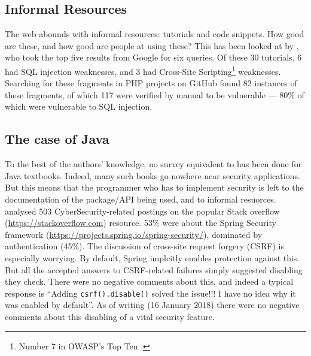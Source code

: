 \documentclass[sigconf,anonymous]{acmart}
\begin{document}
\subsection{Informal Resources}\label{sec:informal}
The web abounds with informal resources: tutorials and code snippets. How good are these, and how good are people at using these? This has been looked at by \cite{Unruhetal2017a}, who took the top five results from Google for six queries. Of these 30 tutorials, 6 had SQL injection weaknesses, and 3 had Cross-Site Scripting\footnote{Number 7 in OWASP's Top Ten \cite{OWASP2017a}.} weaknesses. Searching for these fragments in PHP projects on GitHub found 82 instances of these fragments, of which 117 were verified by manual to be vulnerable --- 80\% of which were vulnerable to SQL injection.

\subsection{The case of Java}\label{sec:Java}
To the best of the authors' knowledge, no survey equivalent to \cite{Drop2019} has been done for Java textbooks. Indeed, many such books go nowhere near security applications.  But this means that the programmer who has to implement security is left to the documentation of the package/API being used, and to informal resuorces. \cite{Mengetal2018a} analysed 503 CyberSecurity-related postings on the popular Stack overflow (\url{https://stackoverflow.com}) resource.  53\% were about the Spring Security framework (\url{https://projects.spring.io/spring-security/}), dominated by authentication (45\%). The discussion \cite[\S4.3.1]{Mengetal2018a} of cross-site request forgery (CSRF) is especially worrying.  By default, Spring implcitly enables protection against this. But all the accepted answers to CSRF-related failures simply suggested disabling they check. There were no negative comments about this, and indeed a typical response is ``Adding \verb!csrf().disable()!
solved the issue!!! I have no idea why it was enabled by default''. As of writing (16 January 2018) there were no negative comments about this disabling of a vital security feature.




\cite{Chenetal2019a,Zorz2019a,Fischeretal2017a}
\end{document}
